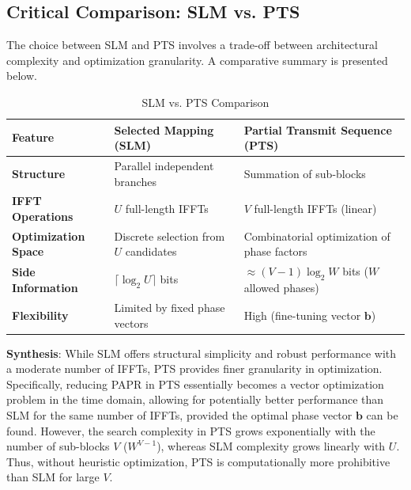 \documentclass[12pt, a4paper, onecolumn]{article}
\begin{document}
\subsection{Critical Comparison: SLM vs. PTS}
The choice between SLM and PTS involves a trade-off between architectural complexity and optimization granularity. A comparative summary is presented below.

\begin{table}[htbp]
    \caption{SLM vs. PTS Comparison}
    \begin{center}
        \begin{tabular}{|l|p{3.5cm}|p{3.5cm}|}
            \hline
            \textbf{Feature}            & \textbf{Selected Mapping (SLM)}        & \textbf{Partial Transmit Sequence (PTS)}          \\ \hline
            \textbf{Structure}          & Parallel independent branches          & Summation of sub-blocks                           \\ \hline
            \textbf{IFFT Operations}    & $U$ full-length IFFTs                  & $V$ full-length IFFTs (linear)                    \\ \hline
            \textbf{Optimization Space} & Discrete selection from $U$ candidates & Combinatorial optimization of phase factors       \\ \hline
            \textbf{Side Information}   & $\lceil \log_2 U \rceil$ bits          & $\approx (V-1)\log_2 W$ bits ($W$ allowed phases) \\ \hline
            \textbf{Flexibility}        & Limited by fixed phase vectors         & High (fine-tuning vector $\mathbf{b}$)            \\ \hline
        \end{tabular}
        \label{tab1}
    \end{center}
\end{table}

\textbf{Synthesis}: While SLM offers structural simplicity and robust performance with a moderate number of IFFTs, PTS provides finer granularity in optimization. Specifically, reducing PAPR in PTS essentially becomes a vector optimization problem in the time domain, allowing for potentially better performance than SLM for the same number of IFFTs, provided the optimal phase vector $\mathbf{b}$ can be found. However, the search complexity in PTS grows exponentially with the number of sub-blocks $V$ ($W^{V-1}$), whereas SLM complexity grows linearly with $U$. Thus, without heuristic optimization, PTS is computationally more prohibitive than SLM for large $V$.
\end{document}
